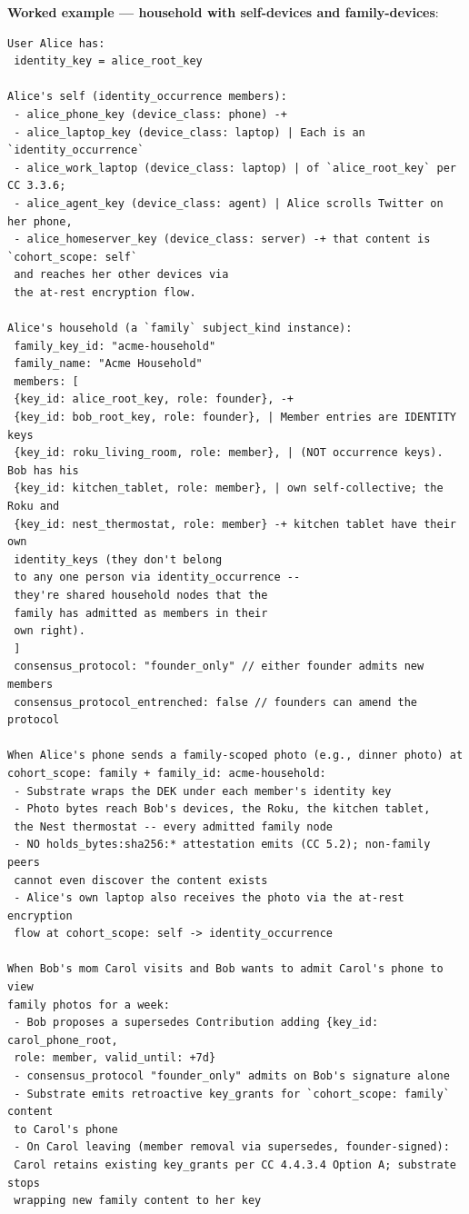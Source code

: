 \documentclass[11pt]{article}
\begin{document}
\textbf{Worked example — household with self-devices and family-devices}:


\begin{lstlisting}
User Alice has:
 identity_key = alice_root_key

Alice's self (identity_occurrence members):
 - alice_phone_key (device_class: phone) -+
 - alice_laptop_key (device_class: laptop) | Each is an `identity_occurrence`
 - alice_work_laptop (device_class: laptop) | of `alice_root_key` per CC 3.3.6;
 - alice_agent_key (device_class: agent) | Alice scrolls Twitter on her phone,
 - alice_homeserver_key (device_class: server) -+ that content is `cohort_scope: self`
 and reaches her other devices via
 the at-rest encryption flow.

Alice's household (a `family` subject_kind instance):
 family_key_id: "acme-household"
 family_name: "Acme Household"
 members: [
 {key_id: alice_root_key, role: founder}, -+
 {key_id: bob_root_key, role: founder}, | Member entries are IDENTITY keys
 {key_id: roku_living_room, role: member}, | (NOT occurrence keys). Bob has his
 {key_id: kitchen_tablet, role: member}, | own self-collective; the Roku and
 {key_id: nest_thermostat, role: member} -+ kitchen tablet have their own
 identity_keys (they don't belong
 to any one person via identity_occurrence --
 they're shared household nodes that the
 family has admitted as members in their
 own right).
 ]
 consensus_protocol: "founder_only" // either founder admits new members
 consensus_protocol_entrenched: false // founders can amend the protocol

When Alice's phone sends a family-scoped photo (e.g., dinner photo) at
cohort_scope: family + family_id: acme-household:
 - Substrate wraps the DEK under each member's identity key
 - Photo bytes reach Bob's devices, the Roku, the kitchen tablet,
 the Nest thermostat -- every admitted family node
 - NO holds_bytes:sha256:* attestation emits (CC 5.2); non-family peers
 cannot even discover the content exists
 - Alice's own laptop also receives the photo via the at-rest encryption
 flow at cohort_scope: self -> identity_occurrence

When Bob's mom Carol visits and Bob wants to admit Carol's phone to view
family photos for a week:
 - Bob proposes a supersedes Contribution adding {key_id: carol_phone_root,
 role: member, valid_until: +7d}
 - consensus_protocol "founder_only" admits on Bob's signature alone
 - Substrate emits retroactive key_grants for `cohort_scope: family` content
 to Carol's phone
 - On Carol leaving (member removal via supersedes, founder-signed):
 Carol retains existing key_grants per CC 4.4.3.4 Option A; substrate stops
 wrapping new family content to her key
\end{lstlisting}
\end{document}

